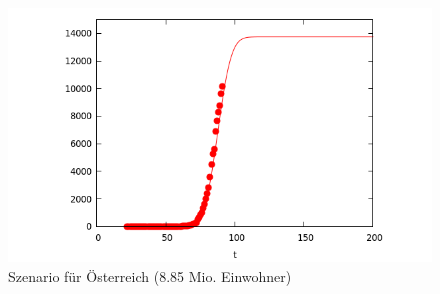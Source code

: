 \documentclass[a4paper,11pt]{article}
\begin{document}
\begin{figure}
  \begin{center}
  \includegraphics[width=.8\textwidth]{Austria.png}
    \caption{Szenario für Österreich (8.85 Mio. Einwohner)}
\end{center}
\end{figure}
\end{document}
